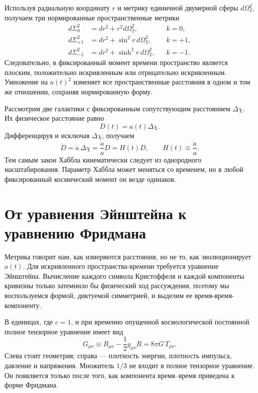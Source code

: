 Используя радиальную координату \(r\) и метрику единичной двумерной сферы \(d\Omega_2^2\), получаем три нормированные пространственные метрики
\begin{align}
d\Sigma_0^2 &= dr^2+r^2d\Omega_2^2,
&& k=0,
\label{eq:c04-flat-space}\\
d\Sigma_{+1}^2 &= dr^2+\sin^2 r\,d\Omega_2^2,
&& k=+1,
\label{eq:c04-spherical-space}\\
d\Sigma_{-1}^2 &= dr^2+\sinh^2 r\,d\Omega_2^2,
&& k=-1.
\label{eq:c04-hyperbolic-space}
\end{align}
Следовательно, в фиксированный момент времени пространство является плоским, положительно искривленным или отрицательно искривленным. Умножение на \(a(t)^2\) изменяет все пространственные расстояния в одном и том же отношении, сохраняя нормированную форму.

Рассмотрим две галактики с фиксированным сопутствующим расстоянием \(\Delta\chi\). Их физическое расстояние равно
\begin{equation}
D(t)=a(t)\Delta\chi.
\end{equation}
Дифференцируя и исключая \(\Delta\chi\), получаем
\begin{equation}
\dot D=\dot a\,\Delta\chi
      =\frac{\dot a}{a}D
      =H(t)D,
\qquad
H(t)\equiv\frac{\dot a}{a}.
\label{eq:c04-hubble-law}
\end{equation}
Тем самым закон Хаббла кинематически следует из однородного масштабирования. Параметр Хаббла может меняться со временем, но в любой фиксированный космический момент он везде одинаков.

\section{От уравнения Эйнштейна к уравнению Фридмана}

Метрика говорит нам, как измеряются расстояния, но не то, как эволюционирует \(a(t)\). Для искривленного пространства-времени требуется уравнение Эйнштейна. Вычисление каждого символа Кристоффеля и каждой компоненты кривизны только затемнило бы физический ход рассуждения, поэтому мы воспользуемся формой, диктуемой симметрией, и выделим ее время-время-компоненту.

В единицах, где \(c=1\), и при временно опущенной космологической постоянной полное тензорное уравнение имеет вид
\begin{equation}
G_{\mu\nu}
\equiv
R_{\mu\nu}-\frac12 g_{\mu\nu}R
=8\pi G\,T_{\mu\nu}.
\label{eq:c04-einstein}
\end{equation}
Слева стоит геометрия; справа — плотность энергии, плотность импульса, давление и напряжения. Множитель \(1/3\) не входит в полное тензорное уравнение. Он появляется только после того, как компонента время–время приведена к форме Фридмана.

